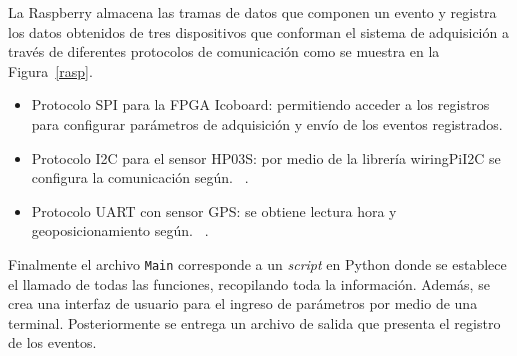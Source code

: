 La Raspberry almacena las tramas de datos que componen un evento y registra los datos obtenidos de tres dispositivos que conforman el sistema de adquisición a través de diferentes protocolos de comunicación como se muestra en la Figura~\ref{rasp}.
\begin{itemize}
    \item Protocolo SPI para la FPGA Icoboard: permitiendo acceder a los registros para configurar parámetros de adquisición y envío de los eventos registrados. 
    \item Protocolo I2C para el sensor HP03S: por medio de la librería wiringPiI2C se configura la comunicación según. ~\citep{HP03SDatasheet}.
    \item Protocolo UART con sensor GPS: se obtiene lectura hora y  geoposicionamiento según. ~\citep{Adafruit2020}.

\end{itemize}


 

Finalmente el archivo \texttt{Main} corresponde a un \textit{script} en Python donde se establece el llamado de todas las funciones, recopilando toda la información.
Además, se crea una interfaz de usuario para el ingreso de parámetros por medio de una terminal.
Posteriormente se entrega un archivo de salida que presenta el registro de los eventos.





